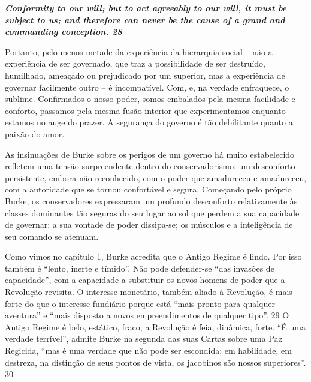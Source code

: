  \textbf{\textit{Conformity to our will; but to act agreeably to our will, it must be subject to us; and therefore can never be the cause of a grand and commanding conception. {{\color{blue} 28} } } }  
 
 
\par
 
Portanto, pelo menos metade da experiência da hierarquia social – não a experiência de ser governado, que traz a possibilidade de ser destruído, humilhado, ameaçado ou prejudicado por um superior, mas a experiência de governar facilmente outro – é incompatível. Com, e, na verdade enfraquece, o sublime. Confirmados o nosso poder, somos embalados pela mesma facilidade e conforto, passamos pela mesma fusão interior que experimentamos enquanto estamos no auge do prazer. A segurança do governo é tão debilitante quanto a paixão do amor.
 
\par
 
As insinuações de Burke sobre os perigos de um governo há muito estabelecido refletem uma tensão surpreendente dentro do conservadorismo: um desconforto persistente, embora não reconhecido, com o poder que amadureceu e amadureceu, com a autoridade que se tornou confortável e segura. Começando pelo próprio Burke, os conservadores expressaram um profundo desconforto relativamente às classes dominantes tão seguras do seu lugar ao sol que perdem a sua capacidade de governar: a sua vontade de poder dissipa-se; os músculos e a inteligência de seu comando se atenuam.
 
\par
 
Como vimos no capítulo 1, Burke acredita que o Antigo Regime é lindo. Por isso também é “lento, inerte e tímido”. Não pode defender-se “das invasões de capacidade”, com a capacidade a substituir os novos homens de poder que a Revolução revisita. O interesse monetário, também aliado à Revolução, é mais forte do que o interesse fundiário porque está “mais pronto para qualquer aventura” e “mais disposto a novos empreendimentos de qualquer tipo”.
 {\color{blue} 29}  
O Antigo Regime é belo, estático, fraco; a Revolução é feia, dinâmica, forte. “É uma verdade terrível”, admite Burke na segunda das suas Cartas sobre uma Paz Regicida, “mas é uma verdade que não pode ser escondida; em habilidade, em destreza, na distinção de seus pontos de vista, os jacobinos são nossos superiores”.
 {\color{blue} 30}  

 
\par
 
